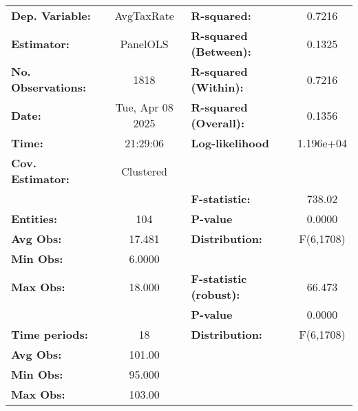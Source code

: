 \begin{center}
\begin{tabular}{lclc}
\toprule
\textbf{Dep. Variable:}              &     AvgTaxRate     & \textbf{  R-squared:         }   &      0.7216      \\
\textbf{Estimator:}                  &      PanelOLS      & \textbf{  R-squared (Between):}  &      0.1325      \\
\textbf{No. Observations:}           &        1818        & \textbf{  R-squared (Within):}   &      0.7216      \\
\textbf{Date:}                       &  Tue, Apr 08 2025  & \textbf{  R-squared (Overall):}  &      0.1356      \\
\textbf{Time:}                       &      21:29:06      & \textbf{  Log-likelihood     }   &    1.196e+04     \\
\textbf{Cov. Estimator:}             &     Clustered      & \textbf{                     }   &                  \\
\textbf{}                            &                    & \textbf{  F-statistic:       }   &      738.02      \\
\textbf{Entities:}                   &        104         & \textbf{  P-value            }   &      0.0000      \\
\textbf{Avg Obs:}                    &       17.481       & \textbf{  Distribution:      }   &    F(6,1708)     \\
\textbf{Min Obs:}                    &       6.0000       & \textbf{                     }   &                  \\
\textbf{Max Obs:}                    &       18.000       & \textbf{  F-statistic (robust):} &      66.473      \\
\textbf{}                            &                    & \textbf{  P-value            }   &      0.0000      \\
\textbf{Time periods:}               &         18         & \textbf{  Distribution:      }   &    F(6,1708)     \\
\textbf{Avg Obs:}                    &       101.00       & \textbf{                     }   &                  \\
\textbf{Min Obs:}                    &       95.000       & \textbf{                     }   &                  \\
\textbf{Max Obs:}                    &       103.00       & \textbf{                     }   &                  \\

\end{tabular}
\end{center}
